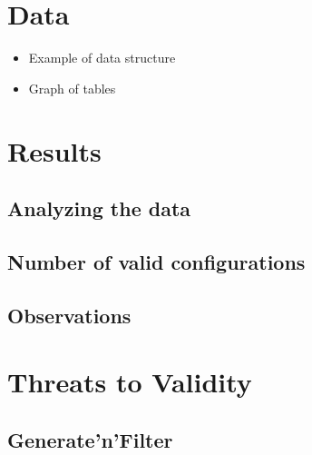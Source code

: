\documentclass[a4paper,11pt]{article}
\begin{document}
\newpage
\section{Data}

\begin{itemize}
    \item Example of data structure
    \item Graph of tables
\end{itemize}




\newpage
\section{Results}

\subsection{Analyzing the data}

\subsection{Number of valid configurations}

\subsection{Observations}




\newpage
\section{Threats to Validity}

\subsection{Generate'n'Filter}
\end{document}
